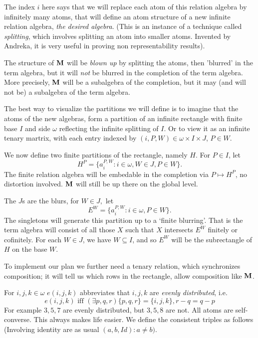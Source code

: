 \documentclass[12pt]{article}
\theoremstyle{definition}
\begin{document}
The index $i$ here  says that we will replace each atom of this relation algebra by infinitely many atoms, that will define an atom structure
of a new infinite relation algebra, {\it the desired algebra}.
(This is an instance of a technique called {\it splitting}, which involves splitting an atom into smaller atoms.
Invented by Andreka, it is very useful in proving non representability  results).

The structure of $\bold M$ will be {\it blown up} by splitting the atoms, then 'blurred' in the term algebra, but it will {\it not} be blurred
in the  completion of the term algebra. More precisely, $\bold M$  will be a subalgebra of the completion,
but it may (and will not be) a subalgebra
of the term algebra.

The best way to visualize the partitions we will define is to imagine that the atoms of the new algebras, form a partition of
an infinite rectangle with finite base $I$ and side $\omega$ reflecting the infinite splitting of $I$.
Or to view it as an infinite tenary martrix,  with each entry indexed by $(i, P,W)\in \omega\times I\times J$, $P\in W$.

We now define two finite partitions of the rectangle, namely $H$.
For $P\in I$, let
$$H^P=\{a_i^{P,W}: i\in \omega, W\in J, P\in W\}.$$
The finite relation algebra will be embedable in the completion via $P\mapsto H^P$,
no distortion involved. $\bold M$ will still be up there on the global level.

The $J$s are the blurs, for $W\in J,$ let
$$E^W=\{a_i^{P,W}: i\in \omega, P\in W\}.$$
The singletons will generate this partition up to a `finite blurring'.
That is the term algebra will consist of all those $X$ such that $X$ intersects $E^W$ finitely or cofinitely.
For each $W\in J$, we have $W\subseteq I$, and so $E^W$ will be the subrectangle of $H$ on the base $W$.

To implement our plan we further need  a tenary relation, which synchronizes composition; it will
tell us  which rows in the rectangle, allow composition like $\bold M$.

For $i,j,k\in \omega$ $e(i,j,k)$ abbreviates that $i,j,k$ are {\it evenly distributed}, i.e.
$$e(i,j,k)\text { iff } (\exists p,q,r)\{p,q,r\}=\{i,j,k\}, r-q=q-p$$
For example $3,5,7$ are evenly distributed, but $3,5,8$ are not.
All atoms are self-converse. This always makes life easier.
We define the consistent triples as follows
(Involving identity are as usual $(a, b, Id): a\neq b).$
\end{document}
